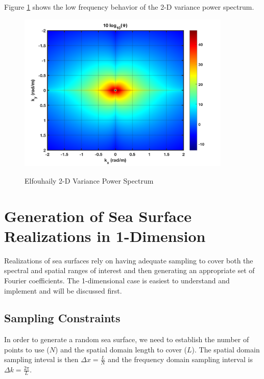Figure \ref{os_fig:7cc} shows the low frequency behavior of the 2-D variance power spectrum.
\begin{figure}[H]
  \begin{center}
\includegraphics[width=4in]{../media/Ocean_Surface/elf_variance_spectrum_2D_zoom.png}
  \end{center}
  \renewcommand{\baselinestretch}{1} \small\normalsize
  \begin{quote}
    \caption[Elfouhaily 2-D Variance Power Spectrum]{Elfouhaily 2-D Variance Power Spectrum\label{os_fig:7cc}}
  \end{quote}
\end{figure}
\renewcommand{\baselinestretch}{2} \small\normalsize

\section{Generation of Sea Surface Realizations in 1-Dimension}\label{os_sec:1d}
Realizations of sea surfaces rely on having adequate sampling to cover both the spectral and spatial ranges of interest and then generating an appropriate set of Fourier coefficients. The 1-dimensional case is easiest to understand and implement and will be discussed first.

\subsection{Sampling Constraints}\label{os_label:1d_sampling_constraints}
In order to generate a random sea surface, we need to establish the number of points to use ($N$) and the spatial domain length to cover ($L$). The spatial domain sampling inteval is then $\Delta x = \frac{L}{N}$ and the frequency domain sampling interval is $\Delta k = \frac{2\pi}{L}$. 

